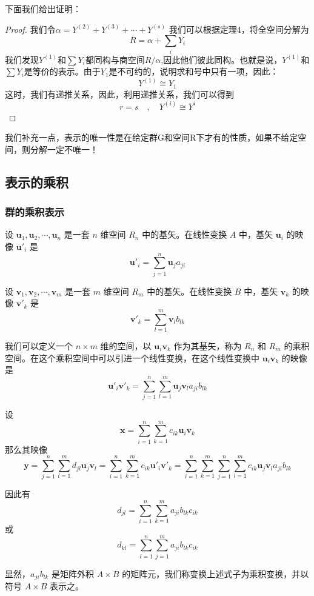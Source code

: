 \documentclass{ctexart}%
\begin{document}
下面我们给出证明：
\begin{proof}
    我们令$\alpha = Y^{(2)} + Y^{(3)} + \cdots + Y^{(s)}$
    我们可以根据定理4，将全空间分解为
    \[R = \alpha +\sum_{i} Y_i\]
    我们发现$Y^{(1)}$和$\sum Y_i$都同构与商空间$R/\alpha$,因此他们彼此同构。也就是说，$Y^{(1)}$和$\sum Y_i$是等价的表示。由于$Y_1$是不可约的，说明求和号中只有一项，因此：
    \[Y^{(1)} \cong Y_1 \]
    这时，我们有递推关系，因此，利用递推关系，我们可以得到
    \[r = s \quad,\quad Y^{(i)} \cong Y^i \]
\end{proof}
我们补充一点，表示的唯一性是在给定群G和空间R下才有的性质，如果不给定空间，则分解一定不唯一！
\subsection{表示的乘积}
\subsubsection{群的乘积表示}
设 \( \mathbf{u}_1, \mathbf{u}_2, \cdots, \mathbf{u}_n \) 是一套 \( n \) 维空间 \( R_n \) 中的基矢。在线性变换 \( A \) 中，基矢 \( \mathbf{u}_i \) 的映像 \( \mathbf{u}'_i \) 是
\[
\mathbf{u}'_i = \sum_{j=1}^n \mathbf{u}_j a_{ji}
\]

设 \( \mathbf{v}_1, \mathbf{v}_2, \cdots, \mathbf{v}_m \) 是一套 \( m \) 维空间 \( R_m \) 中的基矢。在线性变换 \( B \) 中，基矢 \( \mathbf{v}_k \) 的映像 \( \mathbf{v}'_k \) 是
\[
\mathbf{v}'_k = \sum_{l=1}^m \mathbf{v}_l b_{lk}
\]

我们可以定义一个 \( n \times m \) 维的空间，以 \( \mathbf{u}_i \mathbf{v}_k \) 作为其基矢，称为 \( R_n \) 和 \( R_m \) 的乘积空间。在这个乘积空间中可以引进一个线性变换，在这个线性变换中 \( \mathbf{u}_i \mathbf{v}_k \) 的映像是
\[
\mathbf{u}'_i \mathbf{v}'_k = \sum_{j=1}^n \sum_{l=1}^m \mathbf{u}_j \mathbf{v}_l a_{ji} b_{lk}
\]

设
\[
\mathbf{x} = \sum_{i=1}^n \sum_{k=1}^m c_{ik} \mathbf{u}_i \mathbf{v}_k
\]
那么其映像
\[
\mathbf{y} = \sum_{j=1}^n \sum_{l=1}^m d_{jl} \mathbf{u}_j \mathbf{v}_l = \sum_{i=1}^n \sum_{k=1}^m c_{ik} \mathbf{u}'_i \mathbf{v}'_k = \sum_{i=1}^n \sum_{k=1}^m \sum_{j=1}^n \sum_{l=1}^m c_{ik} \mathbf{u}_j \mathbf{v}_l a_{ji} b_{lk}
\]

因此有
\[
d_{jl} = \sum_{i=1}^n \sum_{k=1}^m a_{ji} b_{lk} c_{ik}
\]
或
\[
d_{kl} = \sum_{i=1}^n \sum_{j=1}^m a_{ji} b_{lk} c_{ik}
\]

显然，\( a_{ji} b_{lk} \) 是矩阵外积 \( A \times B \) 的矩阵元，我们称变换上述式子为乘积变换，并以符号 \( A \times B \) 表示之。
\end{document}
